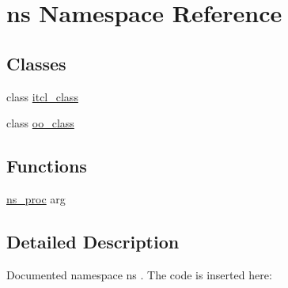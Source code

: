 \hypertarget{namespacens}{\section{ns Namespace Reference}
\label{namespacens}
}
\subsection*{Classes}
\begin{DoxyCompactItemize}
\item 
class \hyperlink{classns_1_1itcl__class}{itcl\-\_\-class}
\item 
class \hyperlink{classns_1_1oo__class}{oo\-\_\-class}
\end{DoxyCompactItemize}
\subsection*{Functions}
\begin{DoxyCompactItemize}
\item 
\hyperlink{namespacens_a1429cbe84d32b17ea4783e5c5c00615b}{ns\-\_\-proc} arg
\end{DoxyCompactItemize}


\subsection{Detailed Description}
Documented namespace {\ttfamily ns} . The code is inserted here\-:


